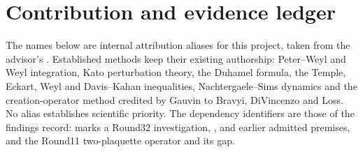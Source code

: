 \section{Contribution and evidence ledger}
\label{sec:contributions}

The names below are internal attribution aliases for this project, taken
from the advisor's
. Established
methods keep their existing authorship: Peter--Weyl and Weyl integration,
Kato perturbation theory, the Duhamel formula, the Temple, Eckart, Weyl and
Davis--Kahan inequalities, Nachtergaele--Sims dynamics and the
creation-operator method credited by Gauvin to Bravyi, DiVincenzo and Loss.
No alias establishes scientific priority. The dependency identifiers are
those of the findings record:  marks a Round32 investigation,
,  and  earlier admitted premises, and
 the Round11 two-plaquette operator and its gap.

